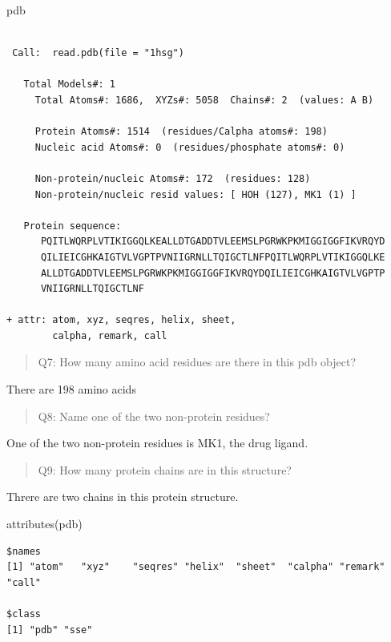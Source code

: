 \documentclass[
  letterpaper,
  DIV=11,
  numbers=noendperiod]{scrartcl}
\newenvironment{Shaded}{\begin{snugshade}}{\end{snugshade}}
\newcommand{\FunctionTok}[1]{\textcolor[rgb]{0.28,0.35,0.67}{#1}}
\newcommand{\NormalTok}[1]{\textcolor[rgb]{0.00,0.23,0.31}{#1}}
\begin{document}
\begin{Shaded}
\begin{Highlighting}[]
\NormalTok{pdb}
\end{Highlighting}
\end{Shaded}

\begin{verbatim}

 Call:  read.pdb(file = "1hsg")

   Total Models#: 1
     Total Atoms#: 1686,  XYZs#: 5058  Chains#: 2  (values: A B)

     Protein Atoms#: 1514  (residues/Calpha atoms#: 198)
     Nucleic acid Atoms#: 0  (residues/phosphate atoms#: 0)

     Non-protein/nucleic Atoms#: 172  (residues: 128)
     Non-protein/nucleic resid values: [ HOH (127), MK1 (1) ]

   Protein sequence:
      PQITLWQRPLVTIKIGGQLKEALLDTGADDTVLEEMSLPGRWKPKMIGGIGGFIKVRQYD
      QILIEICGHKAIGTVLVGPTPVNIIGRNLLTQIGCTLNFPQITLWQRPLVTIKIGGQLKE
      ALLDTGADDTVLEEMSLPGRWKPKMIGGIGGFIKVRQYDQILIEICGHKAIGTVLVGPTP
      VNIIGRNLLTQIGCTLNF

+ attr: atom, xyz, seqres, helix, sheet,
        calpha, remark, call
\end{verbatim}

\begin{quote}
Q7: How many amino acid residues are there in this pdb object?
\end{quote}

There are 198 amino acids

\begin{quote}
Q8: Name one of the two non-protein residues?
\end{quote}

One of the two non-protein residues is MK1, the drug ligand.

\begin{quote}
Q9: How many protein chains are in this structure?
\end{quote}

Threre are two chains in this protein structure.

\begin{Shaded}
\begin{Highlighting}[]
\FunctionTok{attributes}\NormalTok{(pdb)}
\end{Highlighting}
\end{Shaded}

\begin{verbatim}
$names
[1] "atom"   "xyz"    "seqres" "helix"  "sheet"  "calpha" "remark" "call"  

$class
[1] "pdb" "sse"
\end{verbatim}
\end{document}

